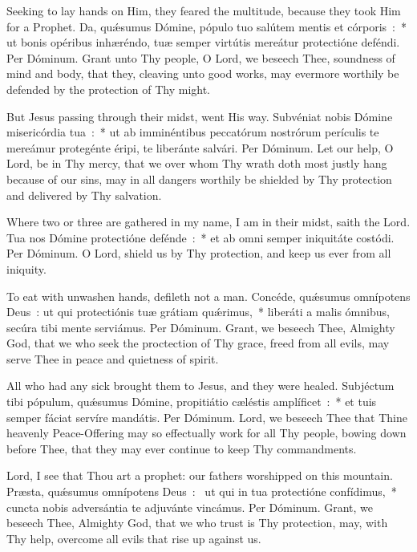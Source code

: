 {{  
  {Seeking to lay hands on Him, they feared the multitude, because they took Him for a Prophet.}
  {Da, quǽsumus Dómine, pópulo tuo salútem mentis et córporis~:~* ut bonis opéribus inhæréndo, tuæ semper virtútis mereátur protectióne deféndi. Per Dóminum.}
  {Grant unto Thy people, O Lord, we beseech Thee, soundness of mind and body, that they, cleaving unto good works, may evermore worthily be defended by the protection of Thy might.}

  {But Jesus passing through their midst, went His way.}
  {Subvéniat nobis Dómine misericórdia tua~:~* ut ab imminéntibus peccatórum nostrórum perículis te mereámur protegénte éripi, te liberánte salvári. Per Dóminum.}
  {Let our help, O Lord, be in Thy mercy, that we over whom Thy wrath doth most justly hang because of our sins, may in all dangers worthily be shielded by Thy protection and delivered by Thy salvation.}

  {Where two or three are gathered in my name, I am in their midst, saith the Lord.}
  {Tua nos Dómine protectióne defénde~:~* et ab omni semper iniquitáte costódi. Per Dóminum.}
  {O Lord, shield us by Thy protection, and keep us ever from all iniquity.}

  {To eat with unwashen hands, defileth not a man.}
  {Concéde, quǽsumus omnípotens Deus~: ut qui protectiónis tuæ grátiam quǽrimus,~* liberáti a malis ómnibus, secúra tibi mente serviámus. Per Dóminum.}
  {Grant, we beseech Thee, Almighty God, that we who seek the proctection of Thy grace, freed from all evils, may serve Thee in peace and quietness of spirit.}

  {All who had any sick brought them to Jesus, and they were healed.}
  {Subjéctum tibi pópulum, quǽsumus Dómine, propitiátio cæléstis amplíficet~:~* et tuis semper fáciat servíre mandátis. Per Dóminum.}
  {Lord, we beseech Thee that Thine heavenly Peace-Offering may so effectually work for all Thy people, bowing down before Thee, that they may ever continue to keep Thy commandments.}

  {Lord, I see that Thou art a prophet: our fathers worshipped on this mountain.}
  {Præsta, quǽsumus omnípotens Deus~:~\dag{} ut qui in tua protectióne confídimus,~* cuncta nobis adversántia te adjuvánte vincámus. Per Dóminum.}
  {Grant, we beseech Thee, Almighty God, that we who trust is Thy protection, may, with Thy help, overcome all evils that rise up against us.}

}}
